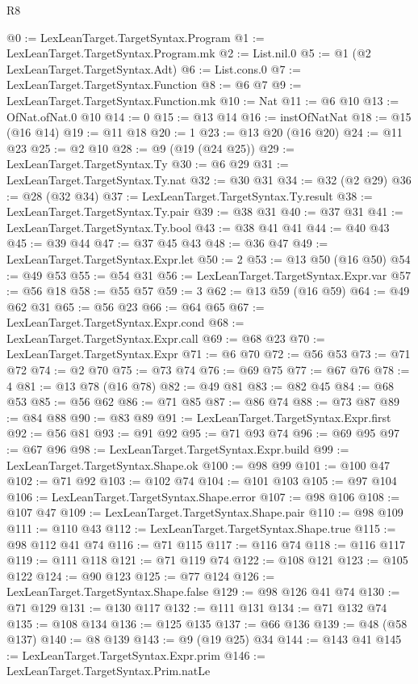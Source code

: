 \begin{lexlean}{R8}
\begin{coremodule}
@0 := LexLeanTarget.TargetSyntax.Program
@1 := LexLeanTarget.TargetSyntax.Program.mk
@2 := List.nil.{0}
@5 := @1 (@2 LexLeanTarget.TargetSyntax.Adt)
@6 := List.cons.{0}
@7 := LexLeanTarget.TargetSyntax.Function
@8 := @6 @7
@9 := LexLeanTarget.TargetSyntax.Function.mk
@10 := Nat
@11 := @6 @10
@13 := OfNat.ofNat.{0} @10
@14 := 0
@15 := @13 @14
@16 := instOfNatNat
@18 := @15 (@16 @14)
@19 := @11 @18
@20 := 1
@23 := @13 @20 (@16 @20)
@24 := @11 @23
@25 := @2 @10
@28 := @9 (@19 (@24 @25))
@29 := LexLeanTarget.TargetSyntax.Ty
@30 := @6 @29
@31 := LexLeanTarget.TargetSyntax.Ty.nat
@32 := @30 @31
@34 := @32 (@2 @29)
@36 := @28 (@32 @34)
@37 := LexLeanTarget.TargetSyntax.Ty.result
@38 := LexLeanTarget.TargetSyntax.Ty.pair
@39 := @38 @31
@40 := @37 @31
@41 := LexLeanTarget.TargetSyntax.Ty.bool
@43 := @38 @41 @41
@44 := @40 @43
@45 := @39 @44
@47 := @37 @45 @43
@48 := @36 @47
@49 := LexLeanTarget.TargetSyntax.Expr.let
@50 := 2
@53 := @13 @50 (@16 @50)
@54 := @49 @53
@55 := @54 @31
@56 := LexLeanTarget.TargetSyntax.Expr.var
@57 := @56 @18
@58 := @55 @57
@59 := 3
@62 := @13 @59 (@16 @59)
@64 := @49 @62 @31
@65 := @56 @23
@66 := @64 @65
@67 := LexLeanTarget.TargetSyntax.Expr.cond
@68 := LexLeanTarget.TargetSyntax.Expr.call
@69 := @68 @23
@70 := LexLeanTarget.TargetSyntax.Expr
@71 := @6 @70
@72 := @56 @53
@73 := @71 @72
@74 := @2 @70
@75 := @73 @74
@76 := @69 @75
@77 := @67 @76
@78 := 4
@81 := @13 @78 (@16 @78)
@82 := @49 @81
@83 := @82 @45
@84 := @68 @53
@85 := @56 @62
@86 := @71 @85
@87 := @86 @74
@88 := @73 @87
@89 := @84 @88
@90 := @83 @89
@91 := LexLeanTarget.TargetSyntax.Expr.first
@92 := @56 @81
@93 := @91 @92
@95 := @71 @93 @74
@96 := @69 @95
@97 := @67 @96
@98 := LexLeanTarget.TargetSyntax.Expr.build
@99 := LexLeanTarget.TargetSyntax.Shape.ok
@100 := @98 @99
@101 := @100 @47
@102 := @71 @92
@103 := @102 @74
@104 := @101 @103
@105 := @97 @104
@106 := LexLeanTarget.TargetSyntax.Shape.error
@107 := @98 @106
@108 := @107 @47
@109 := LexLeanTarget.TargetSyntax.Shape.pair
@110 := @98 @109
@111 := @110 @43
@112 := LexLeanTarget.TargetSyntax.Shape.true
@115 := @98 @112 @41 @74
@116 := @71 @115
@117 := @116 @74
@118 := @116 @117
@119 := @111 @118
@121 := @71 @119 @74
@122 := @108 @121
@123 := @105 @122
@124 := @90 @123
@125 := @77 @124
@126 := LexLeanTarget.TargetSyntax.Shape.false
@129 := @98 @126 @41 @74
@130 := @71 @129
@131 := @130 @117
@132 := @111 @131
@134 := @71 @132 @74
@135 := @108 @134
@136 := @125 @135
@137 := @66 @136
@139 := @48 (@58 @137)
@140 := @8 @139
@143 := @9 (@19 @25) @34
@144 := @143 @41
@145 := LexLeanTarget.TargetSyntax.Expr.prim
@146 := LexLeanTarget.TargetSyntax.Prim.natLe

\end{coremodule}
\end{lexlean}
